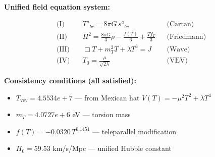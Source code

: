 
\textbf{Unified field equation system:}

\begin{align}
  \text{(I)} \quad & T^a{}_{bc} = 8\pi G \, s^a{}_{bc} && \text{(Cartan)} \\
  \text{(II)} \quad & H^2 = \frac{8\pi G}{3}\rho - \frac{f(T)}{6} + \frac{Tf_T}{3} && \text{(Friedmann)} \\
  \text{(III)} \quad & \Box T + m_T^2 T + \lambda T^3 = J && \text{(Wave)} \\
  \text{(IV)} \quad & T_0 = \frac{\mu}{\sqrt{2\lambda}} && \text{(VEV)}
\end{align}

\textbf{Consistency conditions (all satisfied):}
\begin{itemize}
  \item $T_{\text{vev}} = 4.5534e+7$ — from Mexican hat $V(T) = -\mu^2 T^2 + \lambda T^4$
  \item $m_T = 4.0727e+6$ eV — torsion mass
  \item $f(T) = -0.0320 \, T^{0.1451}$ — teleparallel modification
  \item $H_0 = 59.53$ km/s/Mpc — unified Hubble constant
\end{itemize}